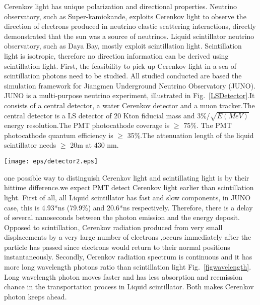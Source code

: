 \documentclass[a4paper,10pt]{cpc-hepnp}
\begin{document}
Cerenkov light has unique polarization and directional properties.
Neutrino observatory, such as Super-kamiokande, exploits Cerenkov
light to observe the direction of electrons produced in neutrino
elastic scattering interactions, directly demonstrated that the
sun was a source of neutrinos. Liquid scintillator neutrino observatory,
such as Daya Bay, mostly exploit scintillation light.
Scintillation light is isotropic, therefore no direction information can be
derived using scintillation light.
First, the feasibility to pick up Cerenkov light in a sea of scintillation photons
need to be studied.
All studied conducted are based the simulation framework for  Jiangmen
Underground Neutrino Observatory (JUNO). JUNO is a multi-purpose
neutrino experiment, illustrated in Fig.~\ref{LSDetector}.It consists
of a central detector, a water Cerenkov detector and a
muon tracker.The central detector is a LS detector of 20 Kton fiducial mass and
3\%/$\sqrt{E(MeV)}$energy resolution.The PMT photocathode coverage is $\ge$ 75\%.
The PMT photocathode quantum efficiency is
$\ge$ 35\%.The attenuation length of the liquid scintillator needs $\ge$ 20m at 430 nm.
\begin{center}
\texttt{[image: eps/detector2.eps]}
\end{center}
one possible way to distinguish Cerenkov light and scintillating light is by their hittime
difference\cite{lab2}.we expect PMT detect Cerenkov light earlier than scintillation light.
First of all, all Liquid scintillator has fast and slow components, in JUNO case, this is 4.93*ns (79.9\%) and 20.6*ns respectively.
Therefore, there is a delay of several nanoseconds between the photon emission and the energy deposit.
Opposed to scintillation, Cerenkov radiation produced from very small displacements by a very large number of electrons
,occurs immediately after the particle has passed since electrons would return to their normal positions
 instantaneously\cite{special_article}.
 Secondly, Cerenkov radiation spectrum is continuous and it has more long wavelength
photons ratio than scintillation light Fig.~\ref{figwavelength}. Long wavelength photon moves faster and has less absorption
 and reemission chance in the transportation process in Liquid scintillator. Both makes Cerenkov photon keeps ahead.
\end{document}
